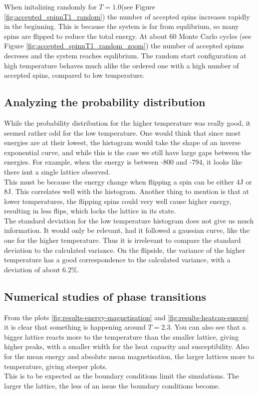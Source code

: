 \documentclass[../main.tex]{subfiles}
\begin{document}
When initalizing randomly for $T = 1.0$(see Figure \ref{fig:accepted_spinnT1_random}) the number of accepted spins increases rapidly in the beginning. This is because the system is far from equlibrium, so many spins are flipped to reduce the total energy. At about 60 Monte Carlo cycles (see Figure \ref{fig:accepted_spinnT1_random_zoom}) the number of accepted spinns decreses and the system reaches equlibrium. The random start configuration at high temperature behaves much alike the ordered one with a high number of accepted spins, compared to low temperature.
\subsection{Analyzing the probability distribution}
While the probability distribution for the higher temperature was really good, it seemed rather odd for the low temperature. One would think that since most energies are at their lowest, the histogram would take the shape of an inverse exponential curve, and while this is the case we still have large gaps between the energies. For example, when the energy is between -800 and -794, it looks like there isnt a single lattice observed. \\
This must be because the energy change when flipping a spin can be either 4J or 8J. This correlates well with the histogram. Another thing to mention is that at lower temperatures, the flipping spins could very well cause higher energy, resulting in less flips, which locks the lattice in its state. \\
The standard deviation for the low temperature histogram does not give us much information. It would only be relevant, had it followed a gaussian curve, like the one for the higher temperature. Thus it is irrelevant to compare the standard deviation to the calculated variance. On the flipside, the variance of the higher temperature has a good correspondence to the calculated variance, with a deviation of about $6.2\%$.

\subsection{Numerical studies of phase transitions}
From the plots \ref{fig:results-energy-magnetisation} and \ref{fig:results-heatcap-suscep} it is clear that something is happening around $T = 2.3$. You can also see that a bigger lattice reacts more to the temperature than the smaller lattice, giving higher peaks, with a smaller width for the heat capacity and susceptibility. Also for the mean energy and absolute mean magnetisation, the larger lattices  more to temperature, giving steeper plots.\\
This is to be expected as the boundary conditions limit the simulations. The larger the lattice, the less of an issue the boundary conditions become.
\end{document}
